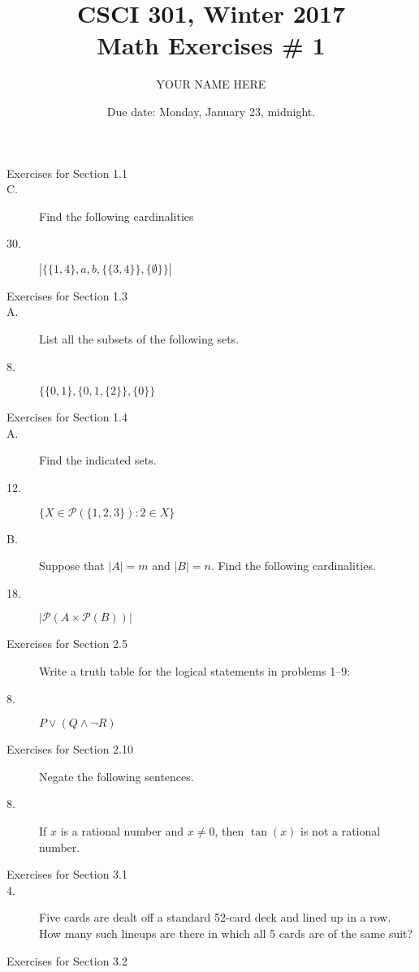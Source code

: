 \documentclass{article}
\title{CSCI 301, Winter 2017\\Math Exercises \# 1}
\author{YOUR NAME HERE}
\date{Due date:  Monday, January 23, midnight.}
\begin{document}
\maketitle


\begin{description}
\item[Exercises for Section 1.1]
\item[C.] Find the following cardinalities
\item[30.] $|\{\{1,4\},a,b,\{\{3,4\}\},\{\emptyset\}\}|$

\item[Exercises for Section 1.3]
\item[A.] List all the subsets of the following sets.
\item[8.] $\{\{0,1\},\{0,1,\{2\}\},\{0\}\}$

\item[Exercises for Section 1.4]
\item[A.] Find the indicated sets.
\item[12.] $\{X\in\mathcal{P}(\{1,2,3\}):2\in X\}$
\item[B.] Suppose that $|A|=m$ and $|B|=n$.  Find the following cardinalities.
\item[18.] $|\mathcal{P}(A\times \mathcal{P}(B))|$


\item[Exercises for Section 2.5] Write a truth table for the logical
  statements in problems 1--9:

\item[8.] $P \vee (Q \wedge \neg R)$

\item[Exercises for Section 2.10]  Negate the following sentences.


\item[8.] If $x$ is a rational number and $x\not = 0$, then
  $\tan(x)$ is not a rational number.
  

\item[Exercises for Section 3.1]

\item[4.]  Five cards are dealt off a standard 52-card deck and
  lined up in a row.  How many such lineups are there in
  which all 5 cards are of the same suit?

\item[Exercises for Section 3.2]


\end{description}
\end{document}
